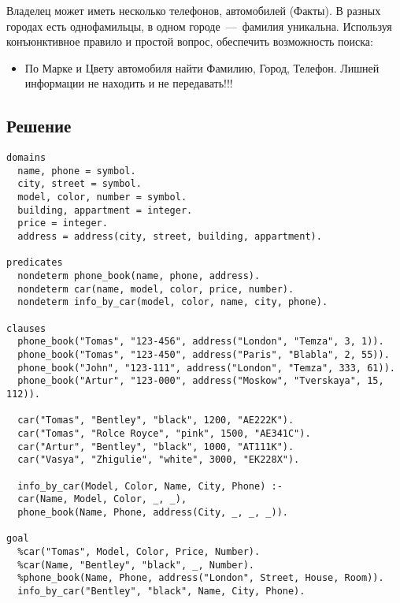 Владелец может иметь несколько телефонов, автомобилей (Факты). В разных городах есть однофамильцы, в одном городе~---~фамилия уникальна.
Используя конъюнктивное правило и простой вопрос, обеспечить возможность поиска:

\begin{itemize}
  \item По Марке и Цвету автомобиля найти Фамилию, Город, Телефон. Лишней информации не находить и не передавать!!!
\end{itemize}

\subsection*{Решение}
\begin{code}
\begin{verbatim}
domains
  name, phone = symbol.
  city, street = symbol.
  model, color, number = symbol.
  building, appartment = integer.
  price = integer.
  address = address(city, street, building, appartment).

predicates
  nondeterm phone_book(name, phone, address).
  nondeterm car(name, model, color, price, number).
  nondeterm info_by_car(model, color, name, city, phone).

clauses
  phone_book("Tomas", "123-456", address("London", "Temza", 3, 1)).
  phone_book("Tomas", "123-450", address("Paris", "Blabla", 2, 55)).
  phone_book("John", "123-111", address("London", "Temza", 333, 61)).
  phone_book("Artur", "123-000", address("Moskow", "Tverskaya", 15, 112)).
  
  car("Tomas", "Bentley", "black", 1200, "AE222K").
  car("Tomas", "Rolce Royce", "pink", 1500, "AE341C").
  car("Artur", "Bentley", "black", 1000, "AT111K").
  car("Vasya", "Zhigulie", "white", 3000, "EK228X").
  
  info_by_car(Model, Color, Name, City, Phone) :- 
  car(Name, Model, Color, _, _), 
  phone_book(Name, Phone, address(City, _, _, _)).
  
goal
  %car("Tomas", Model, Color, Price, Number).
  %car(Name, "Bentley", "black", _, Number).
  %phone_book(Name, Phone, address("London", Street, House, Room)).
  info_by_car("Bentley", "black", Name, City, Phone).
\end{verbatim}
\end{code}

\newpage